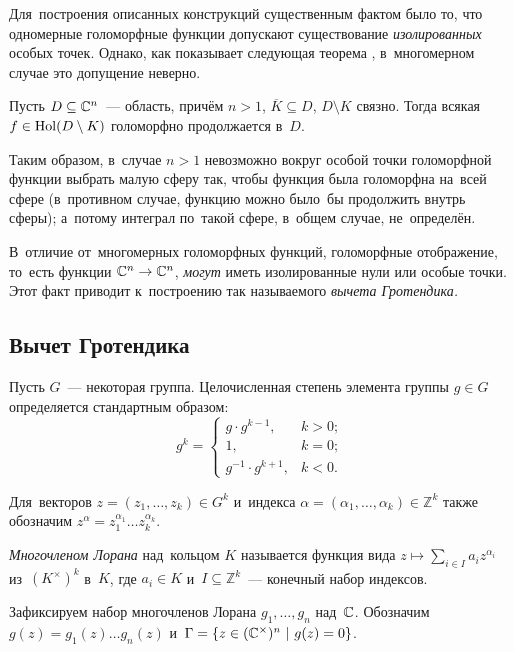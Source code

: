 \documentclass{article}
\begin{document}
Для~построения описанных конструкций существенным фактом было то, что одномерные голоморфные функции допускают
существование \textit{изолированных} особых точек. Однако, как показывает следующая теорема \cite{ShaII}, в~многомерном случае
это допущение неверно.

\begin{theorem*}
  Пусть $D \subseteq \mathbb{C}^n$~— область, причём $n > 1$, $\overline{K} \subseteq D$,
  $D \setminus K$ связно. Тогда всякая $f \in \mathrm{Hol}(D \setminus K)$
  голоморфно продолжается в~$D$.
\end{theorem*}

Таким образом, в~случае $n > 1$ невозможно вокруг особой точки голоморфной функции
выбрать малую сферу так, чтобы функция была голоморфна на~всей сфере (в~противном случае,
функцию можно было~бы продолжить внутрь сферы); а~потому интеграл по~такой сфере, в~общем случае, не~определён.

В~отличие от~многомерных голоморфных функций, голоморфные отображение, то~есть функции $\mathbb{C}^n \rightarrow \mathbb{C}^n$,
\textit{могут} иметь изолированные нули или особые точки. Этот факт приводит к~построению так называемого \textit{вычета Гротендика.}

\subsection{Вычет Гротендика}

Пусть $G$~— некоторая группа. Целочисленная степень элемента группы $g \in G$ определяется стандартным образом:
$$
  g^k =
  \begin{cases}
    g \cdot g^{k - 1}, & k > 0; \\
    1, & k = 0; \\
    g^{-1} \cdot g^{k + 1}, & k < 0.
  \end{cases}
$$

Для~векторов $z = (z_1, \ldots, z_k) \in G^k$ и~индекса $\alpha = (\alpha_1, \ldots, \alpha_k) \in \mathbb{Z}^k$
также обозначим $z^\alpha = z_1^{\alpha_1} \ldots z_k^{\alpha_k}$.

\textit{Многочленом Лорана} над~кольцом $K$ называется функция вида $z \mapsto \sum_{i \in I} a_i z^{\alpha_i}$ из~$(K^\times)^k$ в~$K$,
где $a_i \in K$ и~$I \subseteq \mathbb{Z}^k$~— конечный набор индексов.

Зафиксируем набор многочленов Лорана $g_1, \ldots, g_n$ над~$\mathbb{C}$.
Обозначим $g(z) = g_1(z) \ldots g_n(z)$ и~$\Gamma = \{ z \in (\complex^\times)^n \ | \ g(z) = 0 \}$.
\end{document}
